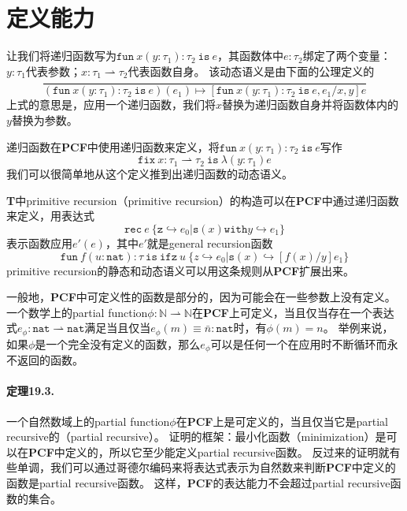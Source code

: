 \section{定义能力}

让我们将递归函数写为\(\mathtt{fun}\ x(y: \tau_1): \tau_2\ \mathtt{is}\ e\)，其函数体中\(e:\tau_2\)绑定了两个变量：\(y: \tau_1\)代表参数；\(x: \tau_1 \rightharpoonup \tau_2\)代表函数自身。
该动态语义是由下面的公理定义的
\[
	\frac{}{
		(\mathtt{fun}\ x(y: \tau_1): \tau_2\ \mathtt{is}\ e)(e_1) \longmapsto [\mathtt{fun}\ x(y: \tau_1): \tau_2\ \mathtt{is}\ e, e_1/x, y]e
	}
\]
上式的意思是，应用一个递归函数，我们将\(x\)替换为递归函数自身并将函数体内的\(y\)替换为参数。

递归函数在\textbf{PCF}中使用递归函数来定义，将\(\mathtt{fun}\ x(y: \tau_1): \tau_2\ \mathtt{is}\ e\)写作
\[
	\mathtt{fix}\ x: \tau_1 \rightharpoonup \tau_2\ \mathtt{is}\ \lambda (y: \tau_1)e
\]
我们可以很简单地从这个定义推到出递归函数的动态语义。

\textbf{T}中\gls{primitive recursion}（primitive recursion）的构造可以在\textbf{PCF}中通过递归函数来定义，用表达式
\[
	\mathtt{rec}\ e\ \{\mathtt{z} \hookrightarrow e_0 | \mathtt{s}(x) \mathtt{with} y \hookrightarrow e_1\}
\]
表示函数应用\(e'(e)\)，其中\(e'\)就是\gls{general recursion}函数
\[
	\mathtt{fun}\ f(u: \mathtt{nat}): \tau\ \mathtt{is}\ \mathtt{ifz}\ u\ \{z \hookrightarrow e_0 | \mathtt{s}(x) \hookrightarrow [f(x)/y]e_1\}
\]
\gls{primitive recursion}的静态和动态语义可以用这条规则从\textbf{PCF}扩展出来。

一般地，\textbf{PCF}中可定义性的函数是部分的，因为可能会在一些参数上没有定义。
一个数学上的\gls{partial function}\(\phi: \mathbb{N} \rightharpoonup \mathbb{N}\)在\textbf{PCF}上可定义，当且仅当存在一个表达式\(e_\phi : \mathtt{nat} \rightharpoonup \mathtt{nat}\)满足当且仅当\(e_\phi(m) \equiv \bar{n}: \mathtt{nat}\)时，有\(\phi(m) = n\)。
举例来说，如果\(\phi\)是一个完全没有定义的函数，那么\(e_\phi\)可以是任何一个在应用时不断循环而永不返回的函数。

\paragraph{定理19.3.} 一个自然数域上的\gls{partial function}\(\phi\)在\textbf{PCF}上是可定义的，当且仅当它是\gls{partial recursive}的（partial recursive）。
\newline
证明的框架：最小化函数（minimization）是可以在\textbf{PCF}中定义的，所以它至少能定义\gls{partial recursive}函数。
反过来的证明就有些单调，我们可以通过哥德尔编码来将表达式表示为自然数来判断\textbf{PCF}中定义的函数是\gls{partial recursive}函数。
这样，\textbf{PCF}的表达能力不会超过\gls{partial recursive}函数的集合。

